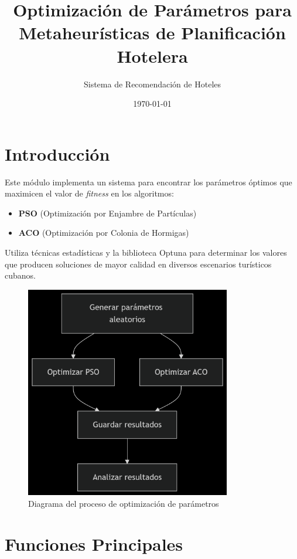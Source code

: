 \documentclass{article}
\title{Optimización de Parámetros para Metaheurísticas de Planificación Hotelera}
\author{Sistema de Recomendación de Hoteles}
\date{\today}
\begin{document}
\maketitle

\section{Introducción}
Este módulo implementa un sistema para encontrar los parámetros óptimos que maximicen el valor de \textit{fitness} en los algoritmos:
\begin{itemize}
    \item \textbf{PSO} (Optimización por Enjambre de Partículas)
    \item \textbf{ACO} (Optimización por Colonia de Hormigas)
\end{itemize}

Utiliza técnicas estadísticas y la biblioteca Optuna para determinar los valores que producen soluciones de mayor calidad en diversos escenarios turísticos cubanos.

\begin{figure}[H]
\centering
\includegraphics[width=0.8\textwidth]{optimization_flow.png}
\caption{Diagrama del proceso de optimización de parámetros}
\label{fig:flow}
\end{figure}

\section{Funciones Principales}
\end{document}
